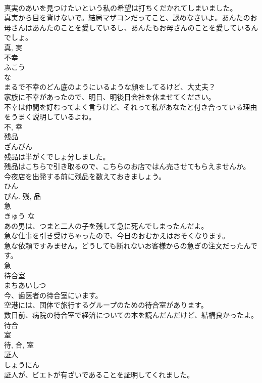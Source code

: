 \documentclass[8pt]{extreport}
\begin{document}
\begin{CJK}{UTF8}{min}
\\	真実のあいを見つけたいという私の希望は打ちくだかれてしまいました。	
\\	真実から目を背けないで。結局マザコンだってこと、認めなさいよ。あんたのお母さんはあんたのことを愛しているし、あんたもお母さんのことを愛しているんでしょ。	
\\	真, 実	
\\	不幸	
\\	ふこう	
\\	な 
\\	まるで不幸のどん底のようにいるような顔をしてるけど、大丈夫？	
\\	家族に不幸があったので、明日、明後日会社を休ませてください。	
\\	不幸は仲間を好むってよく言うけど、それって私があなたと付き合っている理由をうまく説明しているよね。	
\\	不, 幸	
\\	残品	
\\	ざんぴん	
\\	残品は半がくでしょ分しました。	
\\	残品はこちらで引き取るので、こちらのお店ではん売させてもらえませんか。	
\\	今夜店を出発する前に残品を数えておきましょう。	
\\	ひん 
\\	ぴん.	残, 品	
\\	急	
\\	きゅう	な 
\\	あの男は、つまと二人の子を残して急に死んでしまったんだよ。	
\\	急な仕事を引き受けちゃったので、今日のおむかえはおそくなります。	
\\	急な依頼ですみません。どうしても断れないお客様からの急ぎの注文だったんです。	
\\	急	
\\	待合室	
\\	まちあいしつ	
\\	今、歯医者の待合室にいます。	
\\	空港には、団体で旅行するグループのための待合室があります。	
\\	数日前、病院の待合室で経済についての本を読んだんだけど、結構良かったよ。	
\\	待合 
\\	室 
\\	待, 合, 室	
\\	証人	
\\	しょうにん	
\\	証人が、ビエトが有ざいであることを証明してくれました。	

\end{CJK}
\end{document}
